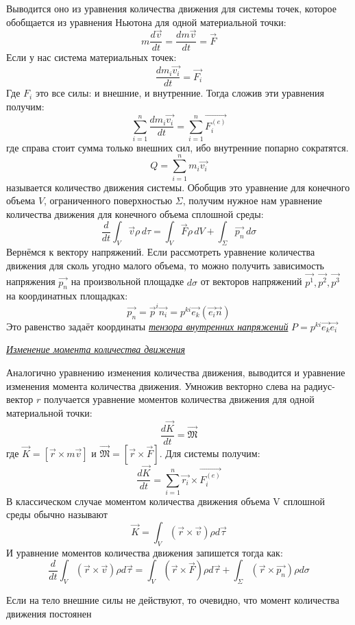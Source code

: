 Выводится оно из уравнения количества движения для системы точек, которое обобщается из уравнения Ньютона для одной материальной точки:
$$
m \frac{d\vec{v}}{dt} = \frac{dm\vec{v}}{dt} = \vec{F}
$$
Если у нас система материальных точек:
$$
\frac{dm_i\vec{v_i}}{dt} = \vec{F_i}
$$
Где $F_i$ это все силы: и внешние, и внутренние. Тогда сложив эти уравнения получим:
$$
\sum_{i = 1}^{n} \frac{dm_i\vec{v_i}}{dt} = \sum_{i = 1}^{n} \vec{F^{(e)}_i}
$$
где справа стоит сумма только внешних сил, ибо внутренние попарно сократятся. 
$$
Q = \sum_{i = 1}^{n} m_i \vec{v_i} 
$$
называется количество движения системы. Обобщив это уравнение для конечного объема $V$, ограниченного поверхностью $\Sigma$, получим нужное нам уравнение количества движения для конечного объема сплошной среды:
$$
\frac{d}{dt}  \int_{V} \vec{v} \rho \,d\tau =  \int_{V} \vec{F} \rho \,dV  + \int_{\Sigma} \vec{p_n} \,d\sigma
$$
Вернёмся к вектору напряжений. Если рассмотреть уравнение количества движения для сколь угодно малого объема, то можно получить зависимость напряжения $\vec{p_n}$ на произвольной площадке $d\sigma$ от векторов напряжений $\vec{p^1}, \vec{p^2}, \vec{p^3}$ на координатных площадках:
$$
\vec{p_n} = \vec{p}^i\vec{n_i} = p^{ki}\vec{e_k}(\vec{e_i}\vec{n})
$$
Это равенство задаёт координаты \textit{\underline{тензора внутренних напряжений}} $P = p^{ki}\vec{e_k}\vec{e_i}$

\begin{center}
    \textit{\underline{Изменение момента количества движения}}
\end{center}
    Аналогично уравнению изменения количества движения, выводится и уравнение изменения момента количества движения.
    Умножив векторно слева на радиус-вектор $r$ получается уравнение моментов количества движения для одной материальной точки:
$$
\frac{d\vec{K}}{dt} = \vec{\mathfrak{M}}
$$
где $\vec{K} = [\vec{r} \times m\vec{v}]$ и $\vec{\mathfrak{M}} = [\vec{r} \times \vec{F}]$. Для системы получим:
$$
\frac{d\vec{K}}{dt} = \sum_{i=1}^{n}\vec{r_i}\times\vec{F_i^{(e)}}
$$
В классическом случае моментом количества движения объема V сплошной среды обычно называют 
$$
\vec{K} = \int_{V} (\vec{r} \times \vec{v}) \rho d \vec{\tau}
$$
И уравнение моментов количества движения запишется тогда как:
$$
\frac{d}{dt} \int_{V} (\vec{r} \times \vec{v}) \rho d\vec{\tau} = \int_{V} (\vec{r} \times \vec{F}) \rho d\vec{\tau} + \int_{\Sigma} (\vec{r} \times \vec{p_n}) \rho d\sigma
$$

Если на тело внешние силы не действуют, то очевидно, что момент количества движения постоянен
